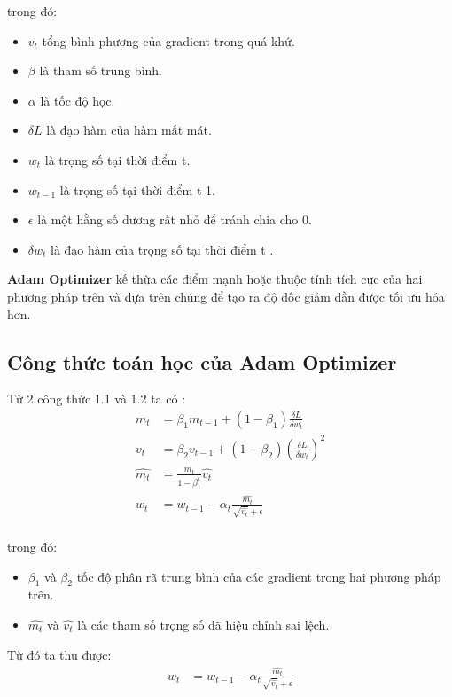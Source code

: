 trong đó:

\begin{itemize}
\item $v_t$ tổng bình phương của gradient trong quá khứ.
\item $\beta$ là tham số trung bình.
\item $\alpha$ là tốc độ học.
\item $\delta L$ là đạo hàm của hàm mất mát.
\item $w_t$ là trọng số tại thời điểm t.
\item $w_{t-1}$ là trọng số tại thời điểm t-1.
\item $\epsilon$ là một hằng số dương rất nhỏ để tránh chia cho 0.
\item $\delta w_t$ là đạo hàm của trọng số tại thời điểm t .

\end{itemize}

\textbf{Adam Optimizer} kế thừa các điểm mạnh hoặc thuộc tính tích cực của hai phương pháp trên và dựa trên chúng để tạo ra độ dốc giảm dần được tối ưu hóa hơn.

\subsection*{Công thức toán học của Adam Optimizer}
Từ 2 công thức 1.1 và 1.2 ta có :
\begin{equation}
\begin{aligned}
m_t & = \beta_1 m_{t-1} + (1 - \beta_1) \frac{\delta L}{\delta w_t} \\
v_t & = \beta_2 v_{t-1} + (1 - \beta_2) (\frac{\delta L}{\delta w_t})^2 \\
\hat{m_t} & = \frac{m_t}{1 - \beta_1^t} \hat{v_t} \\
w_t & = w_{t-1} - \alpha_t \frac{\hat{m_t}}{\sqrt{\hat{v_t}} + \epsilon}\\
\end{aligned}
\end{equation}

trong đó:

\begin{itemize}
\item $\beta_1$ và $\beta_2$ tốc độ phân rã trung bình của các gradient trong hai phương pháp trên.
\item $\hat{m_t}$ và $\hat{v_t}$ là các tham số trọng số đã hiệu chỉnh sai lệch.
\end {itemize} 
Từ đó ta thu được:
\begin{equation}
    \begin{aligned}  
    w_t & = w_{t-1} - \alpha_t \frac{\hat{m_t}}{\sqrt{\hat{v_t}} + \epsilon}\\
\end{aligned}
\end{equation}

